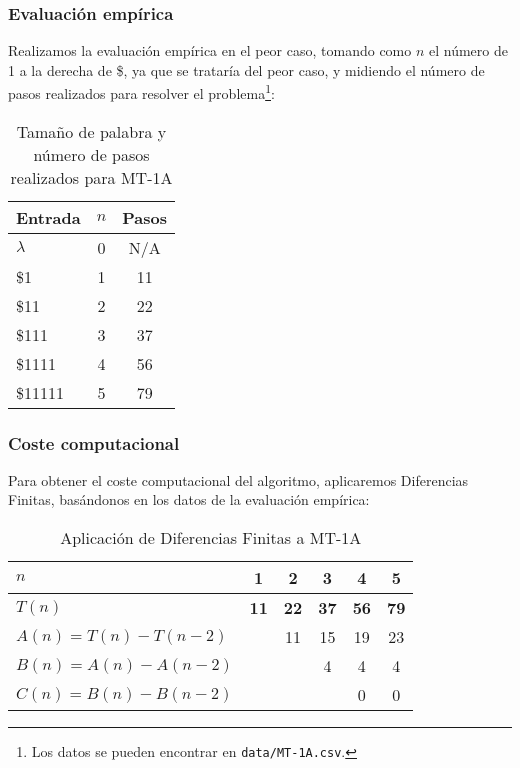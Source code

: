 \subsubsection*{Evaluación empírica}
Realizamos la evaluación empírica en el peor caso, tomando como $n$ el número de 1 a la derecha de \$, ya que se trataría del peor caso, y midiendo el número de pasos realizados para resolver el problema\footnote{Los datos se pueden encontrar en \texttt{data/MT-1A.csv}.}:

\begin{table}[h]
    \centering
    \begin{tabular}{lcc}
        Entrada                & $n$ & Pasos \\
        \hline
        $\lambda$               & 0  & N/A \\
        \$1                     & 1  & 11  \\
        \$11                    & 2  & 22  \\
        \$111                   & 3  & 37  \\
        \$1111                  & 4  & 56  \\
        \$11111                 & 5  & 79  \\
    \end{tabular}
    \caption{Tamaño de palabra y número de pasos realizados para MT-1A}
\end{table}


\subsubsection*{Coste computacional}
Para obtener el coste computacional del algoritmo, aplicaremos Diferencias Finitas, basándonos en los datos de la evaluación empírica:

\begin{table}[h]
    \centering
    \begin{tabular}{|l|c|c|c|c|c|}
        \hline
        $n$ & \textbf{1} & \textbf{2} & \textbf{3} & \textbf{4} & \textbf{5}\\ \hline
        $T(n)$ & \textbf{11} & \textbf{22} & \textbf{37} & \textbf{56} & \textbf{79}      \\ \hline
        \hline
        $A(n) = T(n) - T(n-2)$ &    & 11 & 15 & 19 & 23\\ \hline
        $B(n) = A(n) - A(n-2)$ &    &    &  4 &  4 &  4\\ \hline
        $C(n) = B(n) - B(n-2)$ &    &    &    &  0 &  0 \\ \hline
    \end{tabular}
    \caption{Aplicación de Diferencias Finitas a MT-1A}
\end{table}

